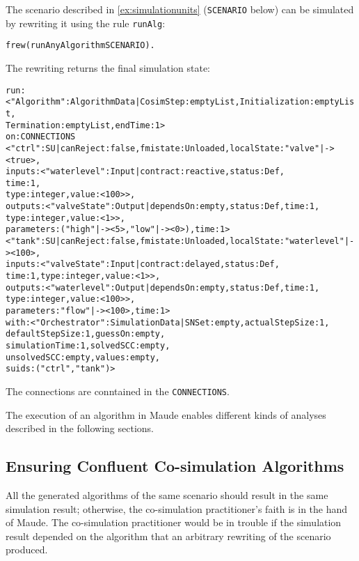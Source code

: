 \begin{example}\label{ex:algoexecution}
The scenario described in \cref{ex:simulationunits} (\texttt{SCENARIO} below) can be simulated by rewriting it using the rule \texttt{runAlg}:
\small
\begin{alltt}
  frew (runAnyAlgorithm SCENARIO).
\end{alltt}
\normalsize
The rewriting returns the final simulation state:
\scriptsize
\begin{alltt}
run: < "Algorithm" : AlgorithmData | CosimStep : emptyList, Initialization : emptyList,
                                     Termination : emptyList, endTime : 1 > 
on: CONNECTIONS
    < "ctrl" : SU | canReject : false, fmistate : Unloaded, localState : "valve" |-> < true >,
                    inputs : < "waterlevel" : Input | contract : reactive, status : Def, 
                                                      time : 1,
                                  type : integer, value : < 100 > >,
outputs : < "valveState" : Output | dependsOn : empty, status : Def, time : 1,
                                    type : integer, value : < 1 > >,
parameters :("high" |-> < 5 >, "low" |-> < 0 >), time : 1 > 
< "tank" : SU | canReject : false, fmistate : Unloaded, localState : "waterlevel" |-> < 100 >,
inputs : < "valveState" : Input | contract : delayed,status : Def,
                                  time : 1, type : integer, value : < 1 > >,
outputs : < "waterlevel" : Output | dependsOn : empty, status : Def,time : 1,
                                    type : integer,value : < 100 > >,
parameters : "flow" |-> < 100 >,time : 1 > 
with: < "Orchestrator" : SimulationData | SNSet : empty,       actualStepSize : 1, 
                                          defaultStepSize : 1, guessOn : empty,
                                          simulationTime : 1,  solvedSCC : empty, 
                                          unsolvedSCC : empty, values : empty,
                                          suids :("ctrl", "tank") >
\end{alltt}
\normalsize
The connections are conntained in the \texttt{CONNECTIONS}.
\end{example}

The execution of an algorithm in Maude enables different kinds of analyses described in the following sections.

\subsection{Ensuring Confluent Co-simulation Algorithms}
All the generated algorithms of the same scenario should result in the same simulation result; otherwise, the co-simulation practitioner's faith is in the hand of Maude.
The co-simulation practitioner would be in trouble if the simulation result depended on the algorithm that an arbitrary rewriting of the scenario produced.

